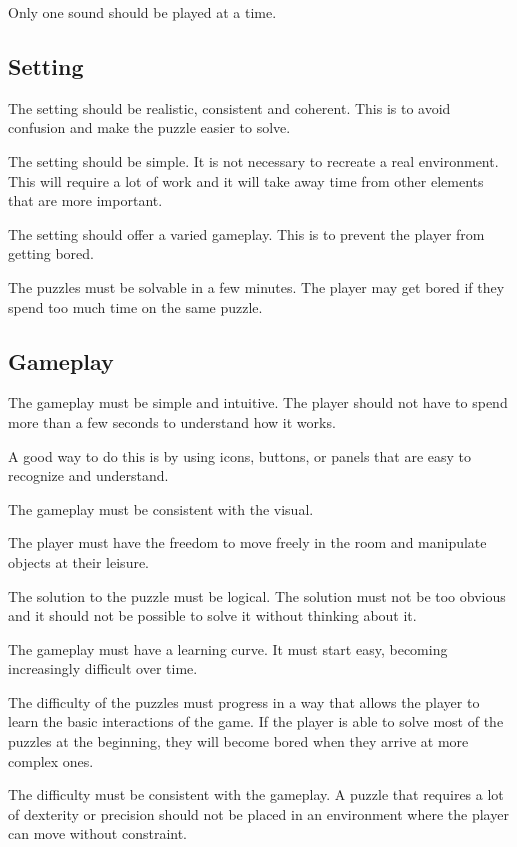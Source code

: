 \documentclass[lettersize,journal]{IEEEtran}
\begin{document}
Only one sound should be played at a time.

\subsection {Setting}

The setting should be realistic, consistent and coherent. This is to avoid confusion and make the puzzle easier to solve.

The setting should be simple. It is not necessary to recreate a real environment. This will require a lot of work and it will take away time from other elements that are more important.

The setting should offer a varied gameplay. This is to prevent the player from getting bored.

The puzzles must be solvable in a few minutes. The player may get bored if they spend too much time on the same puzzle.

\subsection {Gameplay}

The gameplay must be simple and intuitive. The player should not have to spend more than a few seconds to understand how it works.

A good way to do this is by using icons, buttons, or panels that are easy to recognize and understand.

The gameplay must be consistent with the visual. 

The player must have the freedom to move freely in the room and manipulate objects at their leisure.

The solution to the puzzle must be logical. The solution must not be too obvious and it should not be possible to solve it without thinking about it.

The gameplay must have a learning curve. It must start easy, becoming increasingly difficult over time.

The difficulty of the puzzles must progress in a way that allows the player to learn the basic interactions of the game. If the player is able to solve most of the puzzles at the beginning, they will become bored when they arrive at more complex ones.

The difficulty must be consistent with the gameplay. A puzzle that requires a lot of dexterity or precision should not be placed in an environment where the player can move without constraint.
\end{document}

